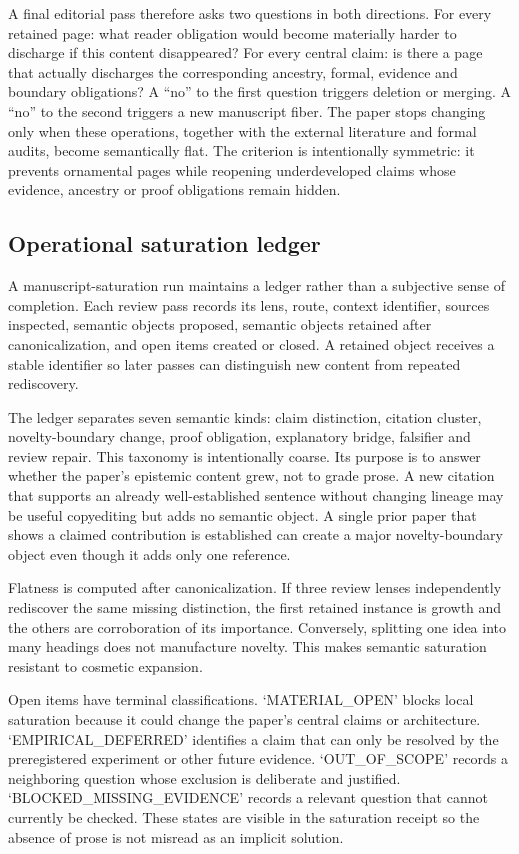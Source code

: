 A final editorial pass therefore asks two questions in both directions. For every retained page: what reader obligation would become materially harder to discharge if this content disappeared? For every central claim: is there a page that actually discharges the corresponding ancestry, formal, evidence and boundary obligations? A ``no'' to the first question triggers deletion or merging. A ``no'' to the second triggers a new manuscript fiber. The paper stops changing only when these operations, together with the external literature and formal audits, become semantically flat. The criterion is intentionally symmetric: it prevents ornamental pages while reopening underdeveloped claims whose evidence, ancestry or proof obligations remain hidden.

\subsection{Operational saturation ledger}

A manuscript-saturation run maintains a ledger rather than a subjective sense of completion. Each review pass records its lens, route, context identifier, sources inspected, semantic objects proposed, semantic objects retained after canonicalization, and open items created or closed. A retained object receives a stable identifier so later passes can distinguish new content from repeated rediscovery.

The ledger separates seven semantic kinds: claim distinction, citation cluster, novelty-boundary change, proof obligation, explanatory bridge, falsifier and review repair. This taxonomy is intentionally coarse. Its purpose is to answer whether the paper's epistemic content grew, not to grade prose. A new citation that supports an already well-established sentence without changing lineage may be useful copyediting but adds no semantic object. A single prior paper that shows a claimed contribution is established can create a major novelty-boundary object even though it adds only one reference.

Flatness is computed after canonicalization. If three review lenses independently rediscover the same missing distinction, the first retained instance is growth and the others are corroboration of its importance. Conversely, splitting one idea into many headings does not manufacture novelty. This makes semantic saturation resistant to cosmetic expansion.

Open items have terminal classifications. `MATERIAL\_OPEN' blocks local saturation because it could change the paper's central claims or architecture. `EMPIRICAL\_DEFERRED' identifies a claim that can only be resolved by the preregistered experiment or other future evidence. `OUT\_OF\_SCOPE' records a neighboring question whose exclusion is deliberate and justified. `BLOCKED\_MISSING\_EVIDENCE' records a relevant question that cannot currently be checked. These states are visible in the saturation receipt so the absence of prose is not misread as an implicit solution.

